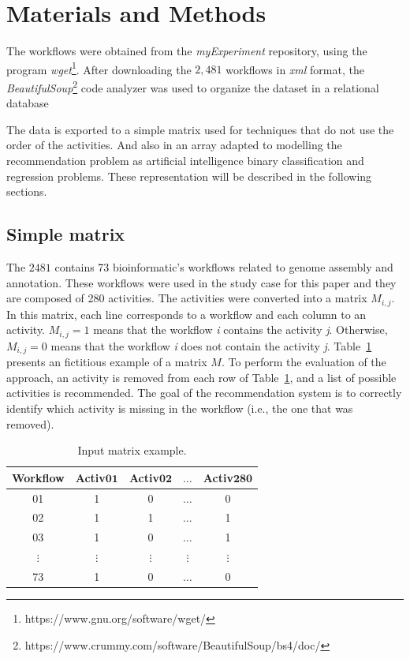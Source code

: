 \documentclass{RITA}
\begin{document}
\section{Materials and Methods} \label{mat_met}
The workflows were obtained from the \emph{myExperiment} repository, using the program \emph{wget}\footnote{https://www.gnu.org/software/wget/}. After downloading the $2,481$ workflows in \emph{xml} format, the \emph{BeautifulSoup}\footnote{https://www.crummy.com/software/BeautifulSoup/bs4/doc/} code analyzer was used to organize the dataset in a relational database

The data is exported to a simple matrix used for techniques that do not use the order of the activities. And also in an array adapted to modelling the recommendation problem as artificial intelligence binary classification and regression problems. These representation will be described in the following sections.

\subsection{Simple matrix}
The $2481$ contains 73 bioinformatic's workflows related to genome assembly and annotation. These workflows were used in the study case for this paper and they are composed of 280 activities. The activities were converted into a matrix $M_{i, j}$. In this matrix, each line corresponds to a workflow and each column to an activity. $M_{i, j} = 1$ means that the workflow \emph{i} contains the activity \emph{j}. Otherwise, $M_{i, j} = 0$ means that the workflow \emph{i} does not contain the activity \emph{j}. Table~\ref{tabela_matriz_de_dados} presents an fictitious example of a matrix \(M\). To perform the evaluation of the approach, an activity is removed from each row of Table~\ref{tabela_matriz_de_dados}, and a list of possible activities is recommended. The goal of the recommendation system is to correctly identify which activity is missing in the workflow (i.e., the one that was removed).
\begin{table}[htb]
	\begin{center}
	\label{tabela_matriz_de_dados}
	\caption{Input matrix example.}
	\begin{tabular}{ccccc}  \hline
		\textbf{Workflow} & \textbf{Activ\(\mathbf{01}\)} & \textbf{Activ\(\mathbf{02}\)} & \textbf{\(\mathbf{\ldots}\)} & \textbf{Activ\(\mathbf{280}\)}  \\ \hline
		01 			  & 1 			  & 0 			  & \(\ldots\) 	  & 0  				\\ 
		02 			  & 1 			  & 1 			  & \(\ldots\) 	  & 1  				\\ 
		03 			  & 1 			  & 0 			  & \(\ldots\) 	  & 1  				\\ 
		\(\vdots\) 		  			  & \(\vdots\) 	  & \(\vdots\) 	  & \(\vdots\) 	  & \(\vdots\) 		\\ 
		73 			  & 1 			  & 0 			  & \(\ldots\) 	  & 0  				\\ \hline
	\end{tabular}
	\end{center}
\end{table}
\end{document}
